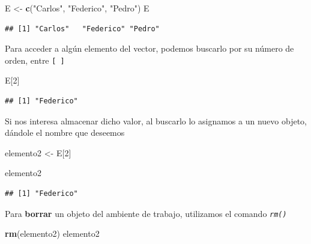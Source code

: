 \documentclass[]{book}
\newenvironment{Shaded}{\begin{snugshade}}{\end{snugshade}}
\newcommand{\DecValTok}[1]{\textcolor[rgb]{0.00,0.00,0.81}{#1}}
\newcommand{\KeywordTok}[1]{\textcolor[rgb]{0.13,0.29,0.53}{\textbf{#1}}}
\newcommand{\NormalTok}[1]{#1}
\newcommand{\StringTok}[1]{\textcolor[rgb]{0.31,0.60,0.02}{#1}}
\begin{document}
\begin{Shaded}
\begin{Highlighting}[]
\NormalTok{E <-}\StringTok{ }\KeywordTok{c}\NormalTok{(}\StringTok{"Carlos"}\NormalTok{, }\StringTok{"Federico"}\NormalTok{, }\StringTok{"Pedro"}\NormalTok{)}
\NormalTok{E}
\end{Highlighting}
\end{Shaded}

\begin{verbatim}
## [1] "Carlos"   "Federico" "Pedro"
\end{verbatim}

Para acceder a algún elemento del vector, podemos buscarlo por su número de orden, entre \texttt{{[}\ {]}}

\begin{Shaded}
\begin{Highlighting}[]
\NormalTok{E[}\DecValTok{2}\NormalTok{]}
\end{Highlighting}
\end{Shaded}

\begin{verbatim}
## [1] "Federico"
\end{verbatim}

Si nos interesa almacenar dicho valor, al buscarlo lo asignamos a un nuevo objeto, dándole el nombre que deseemos

\begin{Shaded}
\begin{Highlighting}[]
\NormalTok{elemento2 <-}\StringTok{ }\NormalTok{E[}\DecValTok{2}\NormalTok{]}
\end{Highlighting}
\end{Shaded}

\begin{Shaded}
\begin{Highlighting}[]
\NormalTok{elemento2}
\end{Highlighting}
\end{Shaded}

\begin{verbatim}
## [1] "Federico"
\end{verbatim}

Para \textbf{borrar} un objeto del ambiente de trabajo, utilizamos el comando \emph{\texttt{rm()}}

\begin{Shaded}
\begin{Highlighting}[]
\KeywordTok{rm}\NormalTok{(elemento2)}
\NormalTok{elemento2}
\end{Highlighting}
\end{Shaded}
\end{document}

